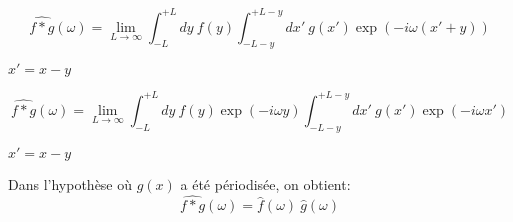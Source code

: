 \documentclass[a4paper, 12pt]{article}
\newcommand{\matlabscript}[2]
  {\begin{itemize}\item[]\end{itemize}}
\begin{document}
\begin{equation}
\widehat{f*g}(\omega)=\lim_{L \rightarrow \infty} \int_{-L}^{+L} 
dy\  f(y)
\int_{-L-y}^{+L-y} dx'\
g(x') \exp \left(-i \omega (x'+y) \right) 
\end{equation}

$x'=x-y$

\begin{equation}
\widehat{f*g}(\omega)=\lim_{L \rightarrow \infty} \int_{-L}^{+L} 
dy\  f(y) \exp \left(-i \omega y \right) 
\int_{-L-y}^{+L-y} dx'\
g(x') \exp \left(-i \omega x'\right) 
\end{equation}

$x'=x-y$

Dans l'hypothèse où $g(x)$ a été périodisée, on obtient:
\begin{equation}
\widehat{f*g}(\omega)=\hat{f}(\omega) \ \hat{g}(\omega)
\end{equation}

%

% 
% 
       
\end{document}
